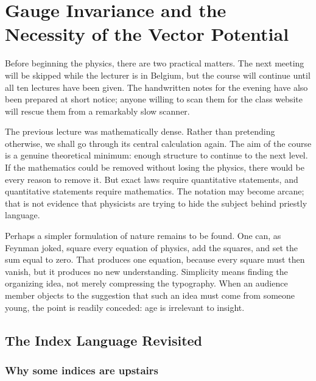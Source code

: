 \chapter{Gauge Invariance and the Necessity of the Vector Potential}

Before beginning the physics, there are two practical matters.  The next
meeting will be skipped while the lecturer is in Belgium, but the course
will continue until all ten lectures have been given.  The handwritten notes
for the evening have also been prepared at short notice; anyone willing to
scan them for the class website will rescue them from a remarkably slow
scanner.

The previous lecture was mathematically dense.  Rather than pretending
otherwise, we shall go through its central calculation again.  The aim of
the course is a genuine theoretical minimum: enough structure to continue
to the next level.  If the mathematics could be removed without losing the
physics, there would be every reason to remove it.  But exact laws require
quantitative statements, and quantitative statements require mathematics.
The notation may become arcane; that is not evidence that physicists are
trying to hide the subject behind priestly language.

Perhaps a simpler formulation of nature remains to be found.  One can, as
Feynman joked, square every equation of physics, add the squares, and set the
sum equal to zero.  That produces one equation, because every square must
then vanish, but it produces no new understanding.  Simplicity means finding
the organizing idea, not merely compressing the typography.  When an
audience member objects to the suggestion that such an idea must come from
someone young, the point is readily conceded: age is irrelevant to insight.


\section{The Index Language Revisited}

\subsection{Why some indices are upstairs}

